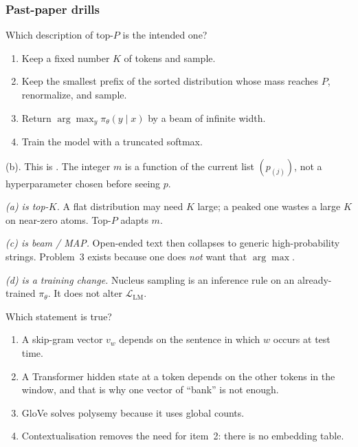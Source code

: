 \subsubsection{Past-paper drills}
\label{subsubsec:nlpu-drills}

\begin{exercise}
\label{ex:nlpu-decode-mcq}
Which description of top-$P$ is the intended one?
\begin{enumerate}[label=(\alph*)]
    \item Keep a fixed number $K$ of tokens and sample.
    \item Keep the smallest prefix of the sorted distribution whose mass reaches $P$, renormalize, and sample.
    \item Return $\arg\max_y\pi_\theta(y\mid x)$ by a beam of infinite width.
    \item Train the model with a truncated softmax.
\end{enumerate}
\end{exercise}

\begin{solution}
(b). This is . The integer $m$ is a function of the current list $(p_{(j)})$, not a hyperparameter chosen before seeing $p$.

\textit{(a) is top-$K$.}
A flat distribution may need $K$ large; a peaked one wastes a large $K$ on near-zero atoms. Top-$P$ adapts $m$.

\textit{(c) is beam / MAP.}
Open-ended text then collapses to generic high-probability strings. Problem~3 exists because one does \emph{not} want that $\arg\max$.

\textit{(d) is a training change.}
Nucleus sampling is an inference rule on an already-trained $\pi_\theta$. It does not alter $\mathcal{L}_{\mathrm{LM}}$.
\end{solution}

\begin{exercise}
\label{ex:nlpu-static-ctx}
Which statement is true?
\begin{enumerate}[label=(\alph*)]
    \item A skip-gram vector $v_w$ depends on the sentence in which $w$ occurs at test time.
    \item A Transformer hidden state at a token depends on the other tokens in the window, and that is why one vector of ``bank'' is not enough.
    \item GloVe solves polysemy because it uses global counts.
    \item Contextualisation removes the need for item~2: there is no embedding table.
\end{enumerate}
\end{exercise}


